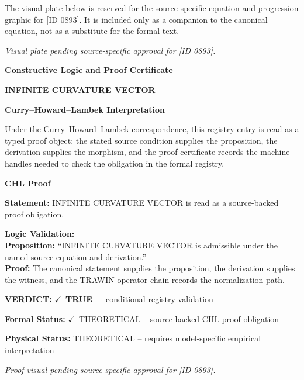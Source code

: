 \begingroup\footnotesize\sloppy
The visual plate below is reserved for the source-specific equation and progression graphic for [ID 0893]. It is included only as a companion to the canonical equation, not as a substitute for the formal text.
\par\endgroup
\begingroup\footnotesize\itshape
Visual plate pending source-specific approval for [ID 0893].
\par\endgroup

\clearpage
\begingroup\tzpsupportsetup
\noindent\textbf{\fontsize{10.8pt}{12.8pt}\selectfont [ID 0893] Constructive Logic and Proof Certificate}\par
\noindent\textbf{\fontsize{10pt}{12pt}\selectfont INFINITE CURVATURE VECTOR}\par
\vspace{0.45em}
\begingroup
\footnotesize
\setlength{\parskip}{0.22em}
\setlength{\parindent}{0pt}
\noindent\textbf{Curry--Howard--Lambek Interpretation}\par
Under the Curry--Howard--Lambek correspondence, this registry entry is read as a typed proof
object: the stated source condition supplies the proposition, the derivation supplies the
morphism, and the proof certificate records the machine handles needed to check the obligation
in the formal registry.

\vspace{0.45em}
\noindent\textbf{CHL Proof}\par
\textbf{Statement:} INFINITE CURVATURE VECTOR is read as a source-backed proof obligation.

\textbf{Logic Validation:}\\
\textbf{Proposition:} ``INFINITE CURVATURE VECTOR is admissible under the named source equation and derivation.''\\
\textbf{Proof:} The canonical statement supplies the proposition, the derivation supplies the witness, and the TRAWIN operator chain records the normalization path.

\textbf{VERDICT:} \ensuremath{\checkmark}\ \textbf{TRUE} --- conditional registry validation

\textbf{Formal Status:} \ensuremath{\checkmark}\ THEORETICAL -- source-backed CHL proof obligation

\textbf{Physical Status:} THEORETICAL -- requires model-specific empirical interpretation
\par\vspace{0.45em}
\par
\vfill
\begingroup\footnotesize\itshape
Proof visual pending source-specific approval for [ID 0893].
\par\endgroup
\vfill
\endgroup
\endgroup
